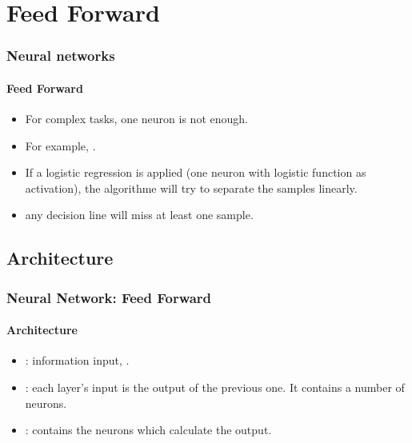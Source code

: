 \documentclass[xcolor=table]{beamer}
\begin{document}
\section{Feed Forward}

\begin{frame}
\frametitle{Neural networks}
\framesubtitle{Feed Forward}

\begin{minipage}{0.59\textwidth}
\begin{itemize}
	\item For complex tasks, one neuron is not enough.
	\item For example, .
	\item If a logistic regression is applied (one neuron with logistic function as activation), the algorithme will try to separate the samples linearly.
	\item any decision line will miss at least one sample.
\end{itemize}
\end{minipage}
\begin{minipage}{0.4\textwidth}
\end{minipage}

\end{frame}

\subsection{Architecture}

\begin{frame}
	\frametitle{Neural Network: Feed Forward}
	\framesubtitle{Architecture}
	
	\begin{minipage}{0.59\textwidth}
		\begin{itemize}
			\item {}: information input, .
			\item {}: each layer's input is the output of the previous one. 
			It contains a number of neurons. 
			\item {}: contains the neurons which calculate the output. 
		\end{itemize}
	\end{minipage}
	\begin{minipage}{0.4\textwidth}
	\end{minipage}
	
\end{frame}
\end{document}
